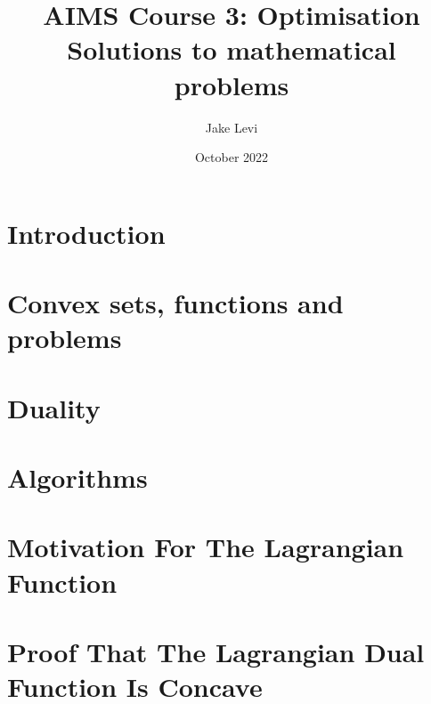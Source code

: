 \documentclass{article}
\title{
    AIMS Course 3: Optimisation \\
    \large Solutions to mathematical problems
}
\author{Jake Levi}
\date{October 2022}
\begin{document}
\maketitle
\section{Introduction} \label{section:intro}

\section{Convex sets, functions and problems}

\section{Duality}

\section{Algorithms}



\appendix
\section{Motivation For The Lagrangian Function}\label{appendix:why lagrangian}

\section{Proof That The Lagrangian Dual Function Is Concave}\label{appendix:proof dual concave}

\end{document}
